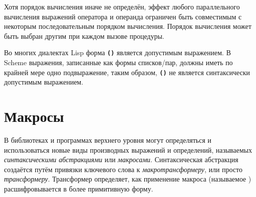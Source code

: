 \begin{entry}{%
}
\begin{note}
Хотя порядок вычисления иначе не определён, эффект любого параллельного вычисления выражений
оператора и операнда ограничен быть совместимым с некоторым последовательным порядком
вычисления. Порядок вычисления может быть выбран другим при каждом вызове процедуры.
\end{note}


\begin{note} %
Во многих диалектах Lisp форма {\tt\textbf{()}} является допустимым выражением. В Scheme
выражения, записанные как формы списков/пар, должны иметь по крайней мере одно подвыражение, таким
образом, {\tt\textbf{()}} не является синтаксически допустимым выражением.
\end{note}

\end{entry}

\section{Макросы}\vspace{1mm}
\label{macrosection}

В библиотеках и программах верхнего уровня могут определяться и использоваться новые виды
производных выражений и определений, называемых {\em синтаксическими абстракциями} или {\em
  макросами}.  Синтаксическая абстракция
создаётся путём привязки ключевого слова к {\em макротрансформеру}, или просто {\em
  трансформеру}. Трансформер
определяет, как применение макроса (называемое ) расшифровывается в
более примитивную форму.\vspace{1mm}


